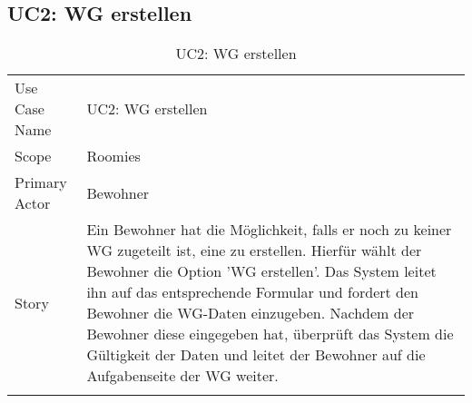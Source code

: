 \subsection{UC2: WG erstellen}
\begin{table}[H]
	\tablestyle
	\tablealtcolored
	\begin{tabularx}{\textwidth}{lX}
		\tablebody
			Use Case Name &
			UC2: WG erstellen
			\tabularnewline
			Scope &
			Roomies
			\tabularnewline
			Primary Actor &
			Bewohner
			\tabularnewline
			Story &
			Ein Bewohner hat die Möglichkeit, falls er noch zu keiner WG zugeteilt ist, eine zu erstellen. Hierfür wählt der Bewohner die Option 'WG erstellen'. Das System leitet ihn auf das entsprechende Formular und fordert den Bewohner die WG-Daten einzugeben. Nachdem der Bewohner diese eingegeben hat, überprüft das System die Gültigkeit der Daten und leitet der Bewohner auf die Aufgabenseite der WG weiter.
			\tabularnewline
		\tableend
	\end{tabularx}
	\caption{UC2: WG erstellen}
\end{table}


